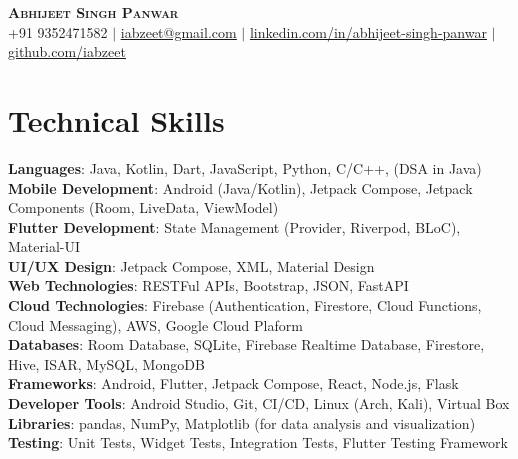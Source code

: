 \documentclass[letterpaper,11pt]{article}
\begin{document}

\begin{center}
    \textbf{\Huge \scshape Abhijeet Singh Panwar} \\ \vspace{1pt}
    \small +91 9352471582 $|$ \href{mailto:x@x.com}{\underline{iabzeet@gmail.com}} $|$ 
    \href{https://linkedin.com/in/...}{\underline{linkedin.com/in/abhijeet-singh-panwar}} $|$
    \href{https://github.com/...}{\underline{github.com/iabzeet}}
\end{center}

\section{Technical Skills}
 \begin{itemize}[leftmargin=0.15in, label={}]
    \small{\item{
     \textbf{Languages}{: Java, Kotlin, Dart, JavaScript, Python, C/C++, (DSA in Java)} \\
     \textbf{Mobile Development}{: Android (Java/Kotlin), Jetpack Compose, Jetpack Components (Room, LiveData, ViewModel)} \\
     \textbf{Flutter Development}{: State Management (Provider, Riverpod, BLoC), Material-UI} \\
     \textbf{UI/UX Design}{: Jetpack Compose, XML, Material Design} \\
     \textbf{Web Technologies}{: RESTFul APIs, Bootstrap, JSON, FastAPI} \\
     \textbf{Cloud Technologies}{: Firebase (Authentication, Firestore, Cloud Functions, Cloud Messaging), AWS, Google Cloud Plaform} \\
     \textbf{Databases}{: Room Database, SQLite, Firebase Realtime Database, Firestore, Hive, ISAR, MySQL, MongoDB} \\
     \textbf{Frameworks}{: Android, Flutter, Jetpack Compose, React, Node.js, Flask} \\
     \textbf{Developer Tools}{: Android Studio, Git, CI/CD, Linux (Arch, Kali), Virtual Box} \\
     \textbf{Libraries}{: pandas, NumPy, Matplotlib (for data analysis and visualization)} \\
    \textbf{Testing}{: Unit Tests, Widget Tests, Integration Tests, Flutter Testing Framework} \\
    }}
 \end{itemize}
\end{document}
